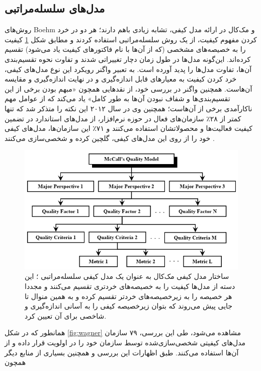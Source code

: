 \subsection{مدل‌های سلسله‌مراتبی}
روش‌های Boehm
\cite{boehm_quantitative_1976}
و مک‌کال
\cite{mccall_factors_1977}
در ارائه مدل کیفی، تشابه زیادی باهم دارند؛ هر دو در خرد کردن مفهوم کیفیت، از یک روش سلسله‌مراتبی استفاده کردند و مطابق شکل
\ref{fig:heir}
کیفیت را به خصیصه‌های مشخصی (که از آن‌ها با نام فاکتورهای کیفیت یاد می‌شود) تقسیم کرده‌اند. این‌گونه مدل‌ها در طول زمان دچار تغییراتی شدند و تفاوت نحوه تقسیم‌بندی آن‌ها، تفاوت مدل‌ها را پدید آورده است.
به تعبیر واگنر
\cite{wagner_software_2013}
رویکرد این نوع مدل‌های کیفی، خرد کردن کیفیت به معیارهای قابل اندازه‌گیری و در نهایت اندازه‌گیری و مقایسه آن‌هاست. همچنین واگنر در بررسی خود، از نقدهایی همچون «مبهم بودن برخی از این تقسیم‌بندی‌ها و شفاف نبودن آن‌ها به طور کامل» یاد می‌کند که از عوامل مهم ناکارآمدی برخی از آن‌هاست؛ همچنین وی در سال ۲۰۱۲ این نکته را متذکر شد که تنها کمتر از ۲۸٪ سازمان‌های فعال در حوزه نرم‌افزار، از مدل‌های استاندارد در تضمین کیفیت فعالیت‌ها و محصولاتشان استفاده می‌کنند و ۷۱٪ این سازمان‌ها، مدل‌های کیفی خود را از روی این مدل‌های کیفی، گلچین کرده و شخصی‌سازی می‌کنند
\cite{wagner_software_2012}.
\begin{figure}[H]
	\centering\includegraphics[width=11	cm]{Resources/heir.PNG}
	\caption[ساختار مدل کیفی مک‌کال به عنوان یک مدل کیفی سلسله‌مراتبی]
	{ساختار مدل کیفی مک‌کال به عنوان یک مدل کیفی سلسله‌مراتبی
		\cite{al-qutaish_quality_2010}؛
		این دسته از مدل‌ها کیفیت را به خصیصه‌های خردتری تقسیم می‌کنند و مجددا هر خصیصه را به زیرخصیصه‌های خردتر تقسیم کرده و به همین منوال تا جایی پیش می‌روند که بتوان زیرخصیصه کیفی را به آسانی اندازه‌گیری و شاخصی برای آن تعیین کرد.
	}
	\label{fig:heir}
\end{figure}
همانطور که در شکل
\ref{fig:wagner}
مشاهده می‌شود، طی این بررسی، ۷۹ سازمان مدل‌های کیفیتی شخصی‌سازی‌شده توسط سازمان خود را در اولویت قرار داده و از آن‌ها استفاده می‌کنند. طبق اظهارات این بررسی و همچنین بسیاری از منابع دیگر همچون
